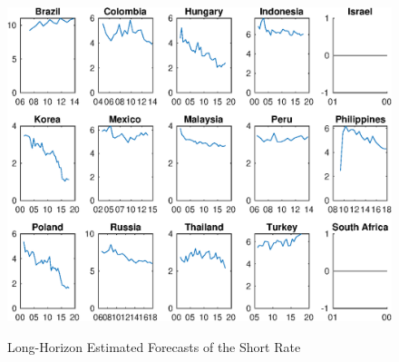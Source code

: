 \documentclass{article}
\begin{document}
\begin{figure}[tbph]
	\begin{center}
		\caption{Long-Horizon Estimated Forecasts of the Short Rate}
		\label{fig:wnCBP}
		\includegraphics[trim={0cm 0cm 0cm 0cm},clip,height=1\textheight,width=1.4\textwidth]{../Figures/Surveys/wnCBP.eps} \\
	\end{center}
\end{figure}
\end{document}
